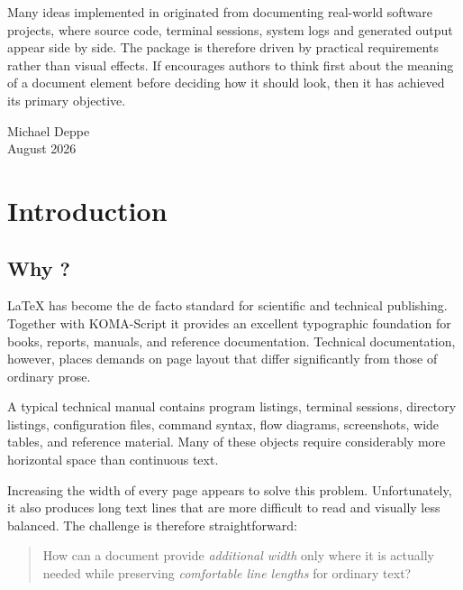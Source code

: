 \documentclass[
11pt,
a4paper,
oneside
]{scrbook}
\begin{document}
Many ideas implemented in \MDWordmark originated from documenting
real-world software projects, where source code, terminal sessions,
system logs and generated output appear side by side. The package is
therefore driven by practical requirements rather than visual effects.
If \MDWordmark encourages authors to think first about the meaning of a
document element before deciding how it should look, then it has
achieved its primary objective.

\bigskip
\bigskip

\begin{flushright}
	Michael Deppe\\
	August 2026
\end{flushright}


\chapter{Introduction}
\label{chap:Introduction}

\section{Why \MDWordmark?}

\begin{MarginFigure}
\end{MarginFigure}

\noindent
\LaTeX{} has become the de facto standard for scientific and technical
publishing.
Together with KOMA-Script it provides an excellent typographic foundation for
books, reports, manuals, and reference documentation.
Technical documentation, however, places demands on page layout that differ
significantly from those of ordinary prose.

A typical technical manual contains program listings, terminal sessions,
directory listings, configuration files, command syntax, flow diagrams,
screenshots, wide tables, and reference material.
Many of these objects require considerably more horizontal space than
continuous text.

Increasing the width of every page appears to solve this problem.
Unfortunately, it also produces long text lines that are more difficult to
read and visually less balanced.
The challenge is therefore straightforward:
\begin{SynchronizedMarginAndTextArea}
\begin{TextInMarginArea}
\end{TextInMarginArea}
\begin{TextInTextArea}

\begin{quote}
	How can a document provide \emph{additional width} only where it is actually needed
	while preserving \emph{comfortable line lengths} for ordinary text?
\end{quote}

\end{TextInTextArea}
\end{SynchronizedMarginAndTextArea}
\end{document}
